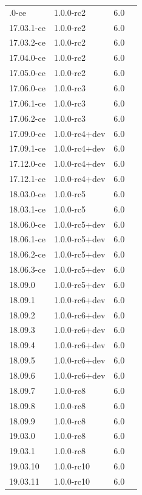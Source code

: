 \documentclass[12pt]{report}
\newcommand{\cmark}{\ding{51}} \newcommand{\xmark}{\ding{55}} \newcommand{\etal}{et~al.\ }
\begin{document}
\begin{doublespace}
{\begin{longtable}{|p{4cm}|p{3cm}||p{3cm}|p{2cm}|}
\hline
\endlastfoot
17.03.0-ce & 1.0.0-rc2 & 6.0 & \cmark \\
17.03.1-ce & 1.0.0-rc2 & 6.0 & \cmark \\
17.03.2-ce & 1.0.0-rc2 & 6.0 & \cmark \\
17.04.0-ce & 1.0.0-rc2 & 6.0 & \cmark \\
17.05.0-ce & 1.0.0-rc2 & 6.0 & \cmark \\
17.06.0-ce & 1.0.0-rc3 & 6.0 & \cmark \\
17.06.1-ce & 1.0.0-rc3 & 6.0 & \cmark \\
17.06.2-ce & 1.0.0-rc3 & 6.0 & \cmark \\
17.09.0-ce & 1.0.0-rc4+dev & 6.0 & \cmark \\
17.09.1-ce & 1.0.0-rc4+dev & 6.0 & \cmark \\
17.12.0-ce & 1.0.0-rc4+dev & 6.0 & \cmark \\
17.12.1-ce & 1.0.0-rc4+dev & 6.0 & \cmark \\
18.03.0-ce & 1.0.0-rc5 & 6.0 & \cmark \\
18.03.1-ce & 1.0.0-rc5 & 6.0 & \cmark \\
18.06.0-ce & 1.0.0-rc5+dev & 6.0 & \cmark \\
18.06.1-ce & 1.0.0-rc5+dev & 6.0 & \cmark \\
18.06.2-ce & 1.0.0-rc5+dev & 6.0 & \cmark \\
18.06.3-ce & 1.0.0-rc5+dev & 6.0 & \cmark \\
18.09.0 & 1.0.0-rc5+dev & 6.0 & \cmark \\
18.09.1 & 1.0.0-rc6+dev & 6.0 & \cmark \\
18.09.2 & 1.0.0-rc6+dev & 6.0 & \cmark \\
18.09.3 & 1.0.0-rc6+dev & 6.0 & \cmark \\
18.09.4 & 1.0.0-rc6+dev & 6.0 & \cmark \\
18.09.5 & 1.0.0-rc6+dev & 6.0 & \cmark \\
18.09.6 & 1.0.0-rc6+dev & 6.0 & \cmark \\
18.09.7 & 1.0.0-rc8 & 6.0 & \cmark \\
18.09.8 & 1.0.0-rc8 & 6.0 & \cmark \\
18.09.9 & 1.0.0-rc8 & 6.0 & \cmark \\
19.03.0 & 1.0.0-rc8 & 6.0 & \cmark \\
19.03.1 & 1.0.0-rc8 & 6.0 & \cmark \\
19.03.10 & 1.0.0-rc10 & 6.0 & \cmark \\
19.03.11 & 1.0.0-rc10 & 6.0 & \cmark \\

\end{longtable}}
\end{doublespace}
\end{document}
